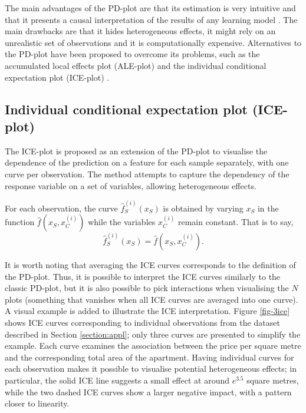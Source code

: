 \documentclass[smallextended,natbib]{svjour3}\usepackage[]{graphicx}\usepackage[]{xcolor}
\begin{document}
The main advantages of the PD-plot are that its estimation is very intuitive and that it presents a causal interpretation of the results of any learning model \citep{zhao2021causal}. The main drawbacks are that it hides heterogeneous effects, it might rely on an unrealistic set of observations and it is computationally expensive. Alternatives to the PD-plot have been proposed to overcome its problems, such as the accumulated local effects plot (ALE-plot) \citep{apley2020visualizing} and the individual conditional expectation plot (ICE-plot) \citep{goldstein2015peeking}.

\subsection{Individual conditional expectation plot (ICE-plot)} \label{sub:ICE}

The ICE-plot is proposed as an extension of the PD-plot to visualise the dependence of the prediction on a feature for each sample separately, with one curve per observation. The method attempts to capture the dependency of the response variable on a set of variables, allowing heterogeneous effects.

For each observation, the curve $\hat f_{S}^{(i)}(x_S)$ is obtained by varying $x_S$ in the function $\hat f(x_S,x_C^{(i)})$ while the variables $x_C^{(i)}$ remain constant. That is to say,
\begin{equation}
 \hat f_{S}^{(i)}(x_S)= \hat f(x_S, x_C^{(i)}). 
\end{equation}

It is worth noting that averaging the ICE curves corresponds to the definition of the PD-plot. 
Thus, it is possible to interpret the ICE curves similarly to the classic PD-plot, but it is also possible to pick interactions when visualising the $N$ plots (something that vanishes when all ICE curves are averaged into one curve). A visual example is added to illustrate the ICE interpretation. Figure \ref{fig-3ice} shows ICE curves corresponding to individual observations from the dataset described in Section \ref{section:appl}; only three curves are presented to simplify the example. Each curve examines the association between the price per square metre and the corresponding total area of the apartment. Having individual curves for each observation makes it possible to visualise potential heterogeneous effects; in particular, the solid ICE line suggests a small effect at around $e^{3.5}$ square metres, while the two dashed ICE curves show a larger negative impact, with a pattern closer to linearity. 
\end{document}

